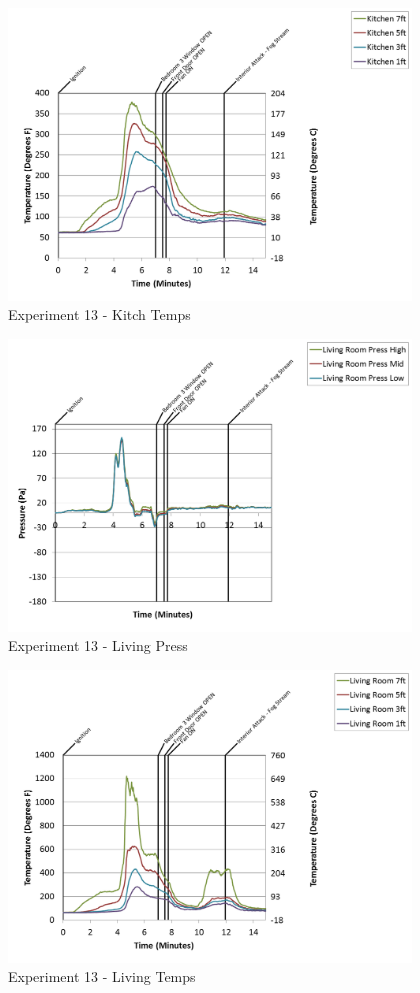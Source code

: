 \documentclass{article}
\begin{document}
\begin{appendices}
\clearpage

\begin{figure}[h!]
	\centering
	\includegraphics[height=3.05in]{0_Images/Results_Charts/Exp_13_Charts/KitchTemps.png}
	\caption{Experiment 13 - Kitch Temps}
\end{figure}


\begin{figure}[h!]
	\centering
	\includegraphics[height=3.05in]{0_Images/Results_Charts/Exp_13_Charts/LivingPress.png}
	\caption{Experiment 13 - Living Press}
\end{figure}

\clearpage

\begin{figure}[h!]
	\centering
	\includegraphics[height=3.05in]{0_Images/Results_Charts/Exp_13_Charts/LivingTemps.png}
	\caption{Experiment 13 - Living Temps}
\end{figure}



\end{appendices}
\end{document}

